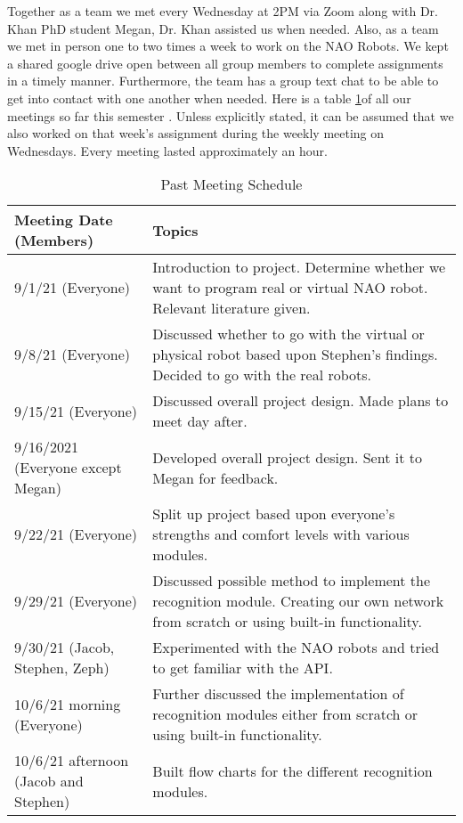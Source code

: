 Together as a team we met every Wednesday at 2PM via Zoom along with Dr. Khan PhD student Megan, Dr. Khan assisted us when needed. Also, as a team we met in person one to two times a week to work on the NAO Robots. We kept a shared google drive open between all group members to complete assignments in a timely manner. Furthermore, the team has a group text chat to be able to get into contact with one another when needed. Here is a table \ref{tab:Past Meeting Schedule}of all our meetings so far this semester . Unless explicitly stated, it can be assumed that we also worked on that week’s assignment during the weekly meeting on Wednesdays. Every meeting lasted approximately an hour. \par 


\begin{table}
    \centering
    \caption{Past Meeting Schedule}
    \label{tab:Past Meeting Schedule}
    \scriptsize
    \begin{tabular}{| l | p{8cm} |}
      \hline
      \textbf{Meeting Date (Members)} & \textbf{Topics} \\
      \hline
      9/1/21 (Everyone)&Introduction to project. Determine whether we want to program real or virtual NAO robot. Relevant literature given.\\
      \hline
      9/8/21 (Everyone)&Discussed whether to go with the virtual or physical robot based upon Stephen’s findings. Decided to go with the real robots.\\
      \hline
      9/15/21 (Everyone)&Discussed overall project design. Made plans to meet day after.\\
      \hline
      9/16/2021 (Everyone except Megan)&Developed overall project design. Sent it to Megan for feedback.\\
      \hline
      9/22/21 (Everyone)&Split up project based upon everyone’s strengths and comfort levels with various modules.\\
      \hline
      9/29/21 (Everyone)&Discussed possible method to implement the recognition module. Creating our own network from scratch or using built-in functionality.\\
      \hline
      9/30/21 (Jacob, Stephen, Zeph)&Experimented with the NAO robots and tried to get familiar with the API. \\
      \hline
      10/6/21 morning (Everyone)&Further discussed the implementation of recognition modules either from scratch or using built-in functionality.\\
      \hline
      10/6/21 afternoon (Jacob and Stephen)&Built flow charts for the different recognition modules.\\

\end{tabular}
\end{table}
